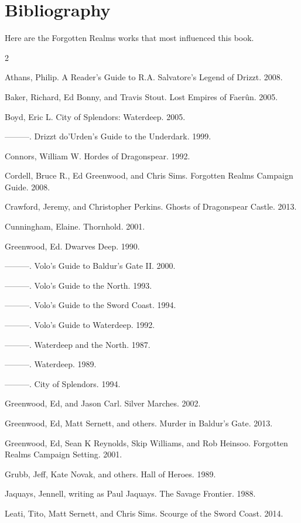 \documentclass[10pt,a4paper,twoside,twocolumn,openany,bg=print,nodeprecatedcode]{dndbook}
\begin{document}
\section{Bibliography}
Here are the Forgotten Realms works that most influenced this book.

\begin{description}[nolistsep]
\begin{multicols}{2}
\item Athans, Philip. A Reader's Guide to R.A. Salvatore's Legend of Drizzt. 2008.
\item Baker, Richard, Ed Bonny, and Travis Stout. Lost Empires of Faerûn. 2005.
\item Boyd, Eric L. City of Splendors: Waterdeep. 2005.
\item ———. Drizzt do'Urden's Guide to the Underdark. 1999.
\item Connors, William W. Hordes of Dragonspear. 1992.
\item Cordell, Bruce R., Ed Greenwood, and Chris Sims. Forgotten Realms Campaign Guide. 2008.
\item Crawford, Jeremy, and Christopher Perkins. Ghosts of Dragonspear Castle. 2013.
\item Cunningham, Elaine. Thornhold. 2001.
\item Greenwood, Ed. Dwarves Deep. 1990.
\item ———. Volo's Guide to Baldur's Gate II. 2000.
\item ———. Volo's Guide to the North. 1993.
\item ———. Volo's Guide to the Sword Coast. 1994.
\item ———. Volo's Guide to Waterdeep. 1992.
\item ———. Waterdeep and the North. 1987.
\item ———. Waterdeep. 1989.
\item ———. City of Splendors. 1994.
\item Greenwood, Ed, and Jason Carl. Silver Marches. 2002.
\item Greenwood, Ed, Matt Sernett, and others. Murder in Baldur's Gate. 2013.
\item Greenwood, Ed, Sean K Reynolds, Skip Williams, and Rob Heinsoo. Forgotten Realms Campaign Setting. 2001.
\item Grubb, Jeff, Kate Novak, and others. Hall of Heroes. 1989.
\item Jaquays, Jennell, writing as Paul Jaquays. The Savage Frontier. 1988.
\item Leati, Tito, Matt Sernett, and Chris Sims. Scourge of the Sword Coast. 2014.

\end{multicols}
\end{description}
\end{document}
